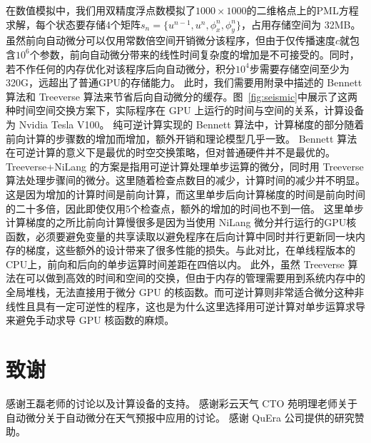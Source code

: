 \documentclass[A4,twoside,UTF8]{ctexart}
\begin{document}
在数值模拟中，我们用双精度浮点数模拟了$1000 \times 1000$的二维格点上的PML方程求解，每个状态要存储4个矩阵$s_n = \{u^{n-1}, u^n, \phi_x^n, \phi_y^n\}$，占用存储空间为 32MB。
虽然前向自动微分可以仅用常数倍空间开销微分该程序，但由于仅传播速度$c$就包含$10^6$个参数，前向自动微分带来的线性时间复杂度的增加是不可接受的。同时，若不作任何的内存优化对该程序后向自动微分，积分$10^4$步需要存储空间至少为320G，远超出了普通GPU的存储能力。
此时，我们需要用附录中描述的 Bennett 算法和 Treeverse 算法来节省后向自动微分的缓存。图~\ref{fig:seismic}中展示了这两种时间空间交换方案下，实际程序在 GPU 上运行的时间与空间的关系，计算设备为 Nvidia Tesla V100。
纯可逆计算实现的 Bennett 算法中，计算梯度的部分随着前向计算的步骤数的增加而增加，额外开销和理论模型几乎一致。
Bennett 算法在可逆计算的意义下是最优的时空交换策略，但对普通硬件并不是最优的。
Treeverse+NiLang 的方案是指用可逆计算处理单步运算的微分，同时用 Treeverse 算法处理步骤间的微分。这里随着检查点数目的减少，计算时间的减少并不明显。这是因为增加的计算时间是前向计算，而这里单步后向计算梯度的时间是前向时间的二十多倍，因此即使仅用5个检查点，额外的增加的时间也不到一倍。
这里单步计算梯度的之所比前向计算慢很多是因为当使用 NiLang 微分并行运行的GPU核函数，必须要避免变量的共享读取以避免程序在后向计算中同时并行更新同一块内存的梯度，这些额外的设计带来了很多性能的损失。与此对比，在单线程版本的CPU上，前向和后向的单步运算时间差距在四倍以内。
此外，虽然 Treeverse 算法在可以做到高效的时间和空间的交换，但由于内存的管理需要用到系统内存中的全局堆栈，无法直接用于微分 GPU 的核函数。而可逆计算则非常适合微分这种非线性且具有一定可逆性的程序，这也是为什么这里选择用可逆计算对单步运算求导来避免手动求导 GPU 核函数的麻烦。

\section*{致谢}

感谢王磊老师的讨论以及计算设备的支持。
感谢彩云天气 CTO 苑明理老师关于自动微分关于自动微分在天气预报中应用的讨论。
感谢 QuEra 公司提供的研究赞助。
\end{document}
